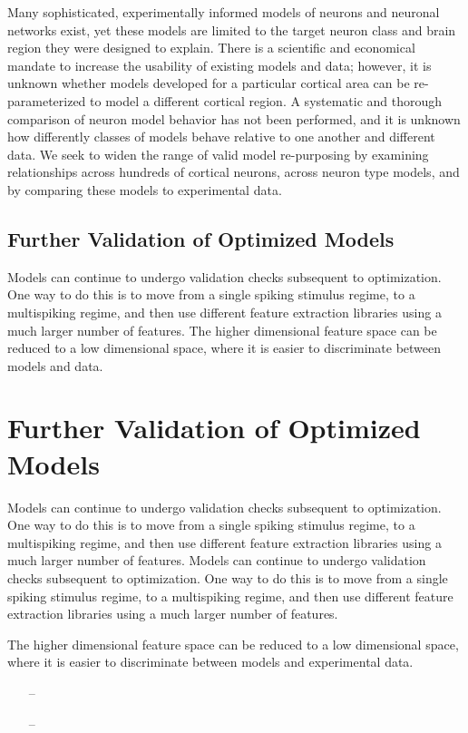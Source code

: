 Many sophisticated, experimentally informed models of neurons and neuronal networks exist, yet these models are limited to the target neuron class and brain region they were designed to explain. There is a scientific and economical mandate to increase the usability of existing models and data; however, it is unknown whether models developed for a particular cortical area can be re-parameterized to model a different cortical region. A systematic and thorough comparison of neuron model behavior has not been performed, and it is unknown how differently classes of models behave relative to one another and different data. We seek to widen the range of valid model re-purposing by examining relationships across hundreds of cortical neurons, across neuron type models, and by comparing these models to experimental data.\newline
\newline


\subsection{Further Validation of Optimized Models}
Models can continue to undergo validation checks subsequent to optimization. One way to do this is to move from a single spiking stimulus regime, to a multispiking regime, and then use different feature extraction libraries using a much larger number of features.  The higher dimensional feature space can be reduced to a low dimensional space, where it is easier to discriminate between models and data.


\section{Further Validation of Optimized Models}
Models can continue to undergo validation checks subsequent to optimization. One way to do this is to move from a single spiking stimulus regime, to a multispiking regime, and then use different feature extraction libraries using a much larger number of features. 
Models can continue to undergo validation checks subsequent to optimization. One way to do this is to move from a single spiking stimulus regime, to a multispiking regime, and then use different feature extraction libraries using a much larger number of features. 

The higher dimensional feature space can be reduced to a low dimensional space, where it is easier to discriminate between models and experimental data.

\begin{itemize}
\item[--] 
\item[--] 
\end{itemize}


